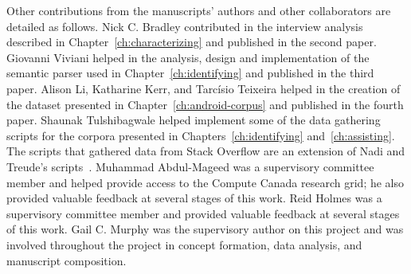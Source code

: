 Other contributions from the manuscripts' authors and other collaborators are detailed as follows.
Nick C. Bradley contributed in
the interview analysis described in Chapter~\ref{ch:characterizing} and published in the second paper.
Giovanni Viviani helped in the analysis, design and implementation of the 
semantic parser used in Chapter~\ref{ch:identifying} and published in the third paper.
Alison Li, Katharine Kerr, and Tarc{\'i}sio Teixeira helped 
in the creation of the dataset presented in Chapter~\ref{ch:android-corpus} and published in the fourth paper.
Shaunak Tulshibagwale helped implement some of the 
data gathering scripts for the 
corpora presented in Chapters~\ref{ch:identifying} and~\ref{ch:assisting}.
The scripts that gathered data from Stack Overflow are an extension of 
 Nadi and Treude's scripts~\cite{nadi2019Rep}.
Muhammad Abdul-Mageed was a supervisory committee member and helped provide access to the 
Compute Canada research grid; he also provided valuable feedback  at several stages of this work. 
Reid Holmes was a supervisory committee member and provided valuable feedback at several stages of this work. 
Gail C. Murphy was the supervisory author on this project
and was involved throughout the project in concept formation, data analysis, and
manuscript composition.

